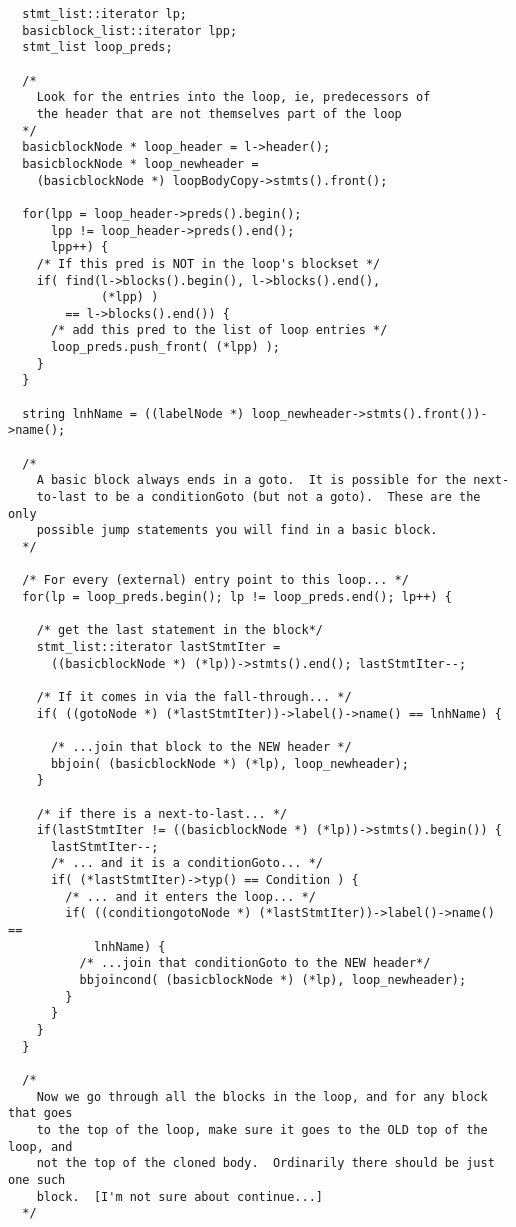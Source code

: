 \documentclass[10pt]{article}
\begin{document}
\begin{small}
\begin{verbatim}
  stmt_list::iterator lp;
  basicblock_list::iterator lpp;
  stmt_list loop_preds;

  /*
    Look for the entries into the loop, ie, predecessors of
    the header that are not themselves part of the loop
  */
  basicblockNode * loop_header = l->header();
  basicblockNode * loop_newheader = 
    (basicblockNode *) loopBodyCopy->stmts().front();
  
  for(lpp = loop_header->preds().begin(); 
      lpp != loop_header->preds().end(); 
      lpp++) {
    /* If this pred is NOT in the loop's blockset */
    if( find(l->blocks().begin(), l->blocks().end(),
             (*lpp) ) 
        == l->blocks().end()) {
      /* add this pred to the list of loop entries */
      loop_preds.push_front( (*lpp) );
    }
  }

  string lnhName = ((labelNode *) loop_newheader->stmts().front())->name();

  /*
    A basic block always ends in a goto.  It is possible for the next-
    to-last to be a conditionGoto (but not a goto).  These are the only
    possible jump statements you will find in a basic block.
  */

  /* For every (external) entry point to this loop... */
  for(lp = loop_preds.begin(); lp != loop_preds.end(); lp++) {

    /* get the last statement in the block*/
    stmt_list::iterator lastStmtIter = 
      ((basicblockNode *) (*lp))->stmts().end(); lastStmtIter--;

    /* If it comes in via the fall-through... */
    if( ((gotoNode *) (*lastStmtIter))->label()->name() == lnhName) {

      /* ...join that block to the NEW header */
      bbjoin( (basicblockNode *) (*lp), loop_newheader);
    }

    /* if there is a next-to-last... */
    if(lastStmtIter != ((basicblockNode *) (*lp))->stmts().begin()) {
      lastStmtIter--;
      /* ... and it is a conditionGoto... */
      if( (*lastStmtIter)->typ() == Condition ) {
        /* ... and it enters the loop... */
        if( ((conditiongotoNode *) (*lastStmtIter))->label()->name() ==
            lnhName) {
          /* ...join that conditionGoto to the NEW header*/
          bbjoincond( (basicblockNode *) (*lp), loop_newheader);
        }
      }
    }
  }

  /*
    Now we go through all the blocks in the loop, and for any block that goes
    to the top of the loop, make sure it goes to the OLD top of the loop, and
    not the top of the cloned body.  Ordinarily there should be just one such
    block.  [I'm not sure about continue...]
  */


\end{verbatim}
\end{small}
\end{document}
